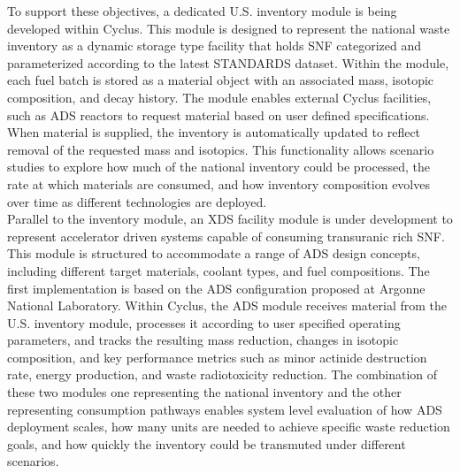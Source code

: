     To support these objectives, a dedicated U.S. inventory module is being developed within Cyclus. This module is designed to 
    represent the national waste inventory as a dynamic storage type facility that holds SNF categorized and parameterized 
    according to the latest STANDARDS dataset. Within the module, each fuel batch is stored as a material object with an 
    associated mass, isotopic composition, and decay history. The module enables external Cyclus facilities, such as 
    ADS reactors to request material based on user defined specifications. When material is supplied, the inventory is 
    automatically updated to reflect removal of the requested mass and isotopics. This functionality allows scenario 
    studies to explore how much of the national inventory could be processed, the rate at which materials are consumed, 
    and how inventory composition evolves over time as different technologies are deployed.\\

    Parallel to the inventory module, an XDS facility module is under development to represent accelerator driven systems 
    capable of consuming transuranic rich SNF. This module is structured to accommodate a range of ADS design concepts, 
    including different target materials, coolant types, and fuel compositions. The first implementation is based on the 
    ADS configuration proposed at Argonne National Laboratory. Within Cyclus, the ADS module receives material from the 
    U.S. inventory module, processes it according to user specified operating parameters, and tracks the resulting mass reduction, 
    changes in isotopic composition, and key performance metrics such as minor actinide destruction rate, energy production, 
    and waste radiotoxicity reduction. The combination of these two modules one representing the national inventory and 
    the other representing consumption pathways enables system level evaluation of how ADS deployment scales, how many 
    units are needed to achieve specific waste reduction goals, and how quickly the inventory could be transmuted under 
    different scenarios.\\

